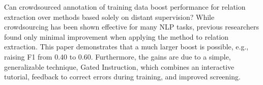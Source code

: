 Can crowdsourced annotation of training data boost performance for relation extraction over methods based solely on distant supervision?  While crowdsourcing has been shown effective for many NLP tasks, previous researchers found only minimal improvement when applying the method to relation extraction. This paper demonstrates that a much larger boost is possible, e.g., raising F1 from 0.40 to 0.60. Furthermore, the gains are due to a simple, generalizable technique, Gated Instruction, which combines an interactive tutorial, feedback to correct errors during training, and improved screening.
